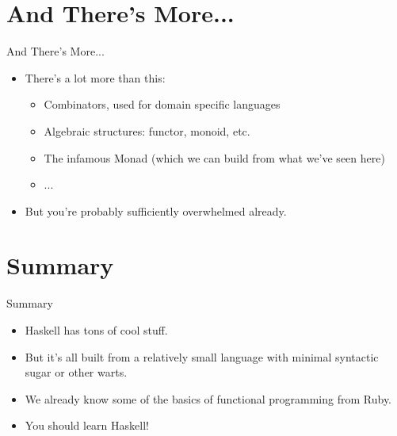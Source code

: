\documentclass[xcolor=dvipsnames]{beamer}          %
\begin{document}
\section{And There's More...}

\begin{frame}[fragile]{And There's More...}
\begin{itemize}
    \item There's a lot more than this:
        \begin{itemize}
        \item Combinators, used for domain specific languages
        \item Algebraic structures: functor, monoid, etc.
        \item The infamous Monad
            (which we can build from what we've seen here)
        \item ...
        \end{itemize}
    \item But you're probably sufficiently overwhelmed already.
\end{itemize}
\end{frame}


\section{Summary}

\begin{frame}{Summary}
\begin{itemize}
    \item Haskell has tons of cool stuff.
    \item But it's all built from a relatively small language with
        minimal syntactic sugar or other warts.
    \item We already know some of the basics of functional programming
        from Ruby.
    \item You should learn Haskell!
\end{itemize}
\end{frame}
\end{document}
